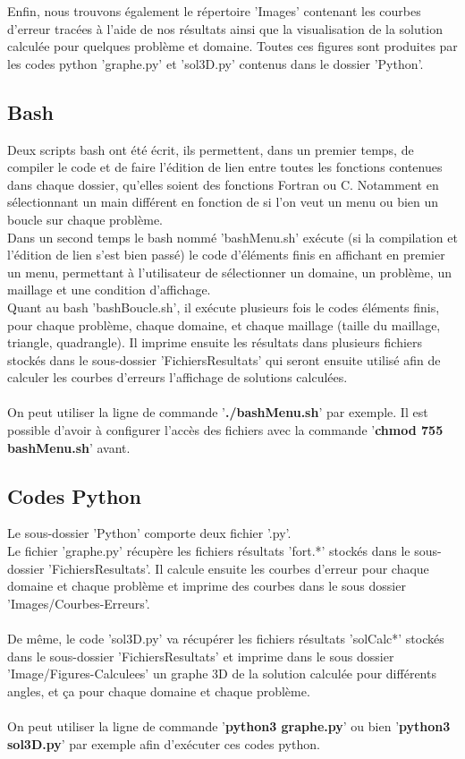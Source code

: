 \documentclass[a4paper, 12pt, french]{report}
\begin{document}
Enfin, nous trouvons également le répertoire 'Images' contenant les courbes d'erreur tracées à l'aide de nos résultats ainsi que la visualisation de la solution calculée pour quelques problème et domaine. Toutes ces figures sont produites par les codes python 'graphe.py' et 'sol3D.py' contenus dans le dossier 'Python'.


\subsection{Bash}
\label{bash}

Deux scripts bash ont été écrit, ils permettent, dans un premier temps, de compiler le code et de faire l'édition de lien entre toutes les fonctions contenues dans chaque dossier, qu'elles soient des fonctions Fortran ou C. Notamment en sélectionnant un main différent en fonction de si l'on veut un menu ou bien un boucle sur chaque problème. \\
Dans un second temps le bash nommé 'bashMenu.sh' exécute (si la compilation et l'édition de lien s'est bien passé) le code d'éléments finis en affichant en premier un menu, permettant à l'utilisateur de sélectionner un domaine, un problème, un maillage et une condition d'affichage.\\
Quant au bash 'bashBoucle.sh', il exécute plusieurs fois le codes éléments finis, pour chaque problème, chaque domaine, et chaque maillage (taille du maillage, triangle, quadrangle). Il imprime ensuite les résultats dans plusieurs fichiers stockés dans le sous-dossier 'FichiersResultats' qui seront ensuite utilisé afin de calculer les courbes d'erreurs l'affichage de solutions calculées.\\\\

On peut utiliser la ligne de commande '\textbf{./bashMenu.sh}' par exemple. Il est possible d'avoir à configurer l'accès des fichiers avec la commande '\textbf{chmod 755 bashMenu.sh}' avant.


\subsection{Codes Python}

Le sous-dossier 'Python' comporte deux fichier '.py'.\\
Le fichier 'graphe.py' récupère les fichiers résultats 'fort.*' stockés dans le sous-dossier 'FichiersResultats'. Il calcule ensuite les courbes d'erreur pour chaque domaine et chaque problème et imprime des courbes dans le sous dossier 'Images/Courbes-Erreurs'.\\\\
De même, le code 'sol3D.py' va récupérer les fichiers résultats 'solCalc*' stockés dans le sous-dossier 'FichiersResultats' et imprime dans le sous dossier 'Image/Figures-Calculees' un graphe 3D de la solution calculée pour différents angles, et ça pour chaque domaine et chaque problème.\\\\
On peut utiliser la ligne de commande '\textbf{python3 graphe.py}' ou bien '\textbf{python3 sol3D.py}' par exemple afin d'exécuter ces codes python.\\\\
\end{document}
